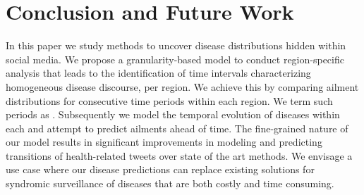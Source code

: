 \section{Conclusion and Future Work}
\label{sec:conclusion}
In this paper we study methods to uncover disease distributions hidden
within social media.  We propose a granularity-based model to conduct
region-specific analysis that leads to the identification of time
intervals characterizing homogeneous disease discourse, per region.
We achieve this by comparing ailment distributions for consecutive
time periods within each region.  We term such periods as
\emph{\changes}.  Subsequently we model the temporal evolution of
diseases within each \emph{\changes} and attempt to predict ailments
ahead of time.  The fine-grained nature of our model results in
significant improvements in modeling and predicting transitions of
health-related tweets over state of the art methods.  We envisage a
use case where our disease predictions can replace existing solutions
for syndromic surveillance of diseases that are both costly and time
consuming.
